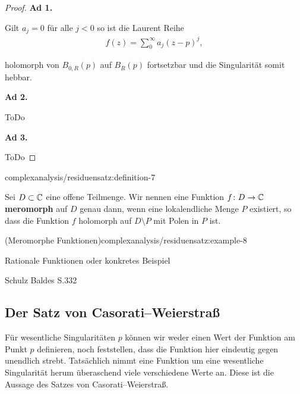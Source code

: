 \begin{proof}
 \textbf{Ad 1.}

\par
Gilt \(a_j=0\) für alle \(j<0\) so ist die Laurent Reihe
\begin{align*}
f(z) = \sum_{0}^\infty a_j (z-p)^j,
\end{align*}
\par
holomorph von \(B_{0,R}(p)\) auf \(B_R(p)\) fortsetzbar und die Singularität somit hebbar.

\par
\textbf{Ad 2.}

\par
ToDo

\par
\textbf{Ad 3.}

\par
ToDo
\end{proof}
\begin{definition}{}{complexanalysis/residuensatz:definition-7}



\par
Sei \(D \subset \mathbb{C}\) eine offene Teilmenge.
Wir nennen eine Funktion \(f \colon D \rightarrow \mathbb{C}\) \textbf{meromorph} auf \(D\) genau dann, wenn eine lokalendliche Menge \(P\) existiert, so dass die Funktion \(f\) holomorph auf \(D \setminus P\) mit Polen in \(P\) ist.
\end{definition}
\begin{example}{(Meromorphe Funktionen)}{complexanalysis/residuensatz:example-8}



\par
Rationale Funktionen oder konkretes Beispiel

\par
Schulz Baldes S.332
\end{example}


\subsection{Der Satz von Casorati–Weierstraß}
\label{\detokenize{complexanalysis/residuensatz:der-satz-von-casorati-weierstrasz}}
\par
Für wesentliche Singularitäten \(p\) können wir weder einen Wert der Funktion am Punkt \(p\) definieren, noch feststellen, dass die Funktion hier eindeutig gegen unendlich strebt. Tatsächlich nimmt eine Funktion um eine wesentliche Singularität herum überaschend viele verschiedene Werte an. Diese ist die Aussage des Satzes von Casorati–Weierstraß.

